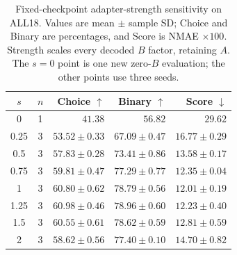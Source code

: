 \begin{table}[t]
\centering
\footnotesize
\setlength{\tabcolsep}{3pt}
\caption{Fixed-checkpoint adapter-strength sensitivity on ALL18. Values are mean $\pm$ sample SD; Choice and Binary are percentages, and Score is NMAE $\times100$. Strength scales every decoded $B$ factor, retaining $A$. The $s=0$ point is one new zero-$B$ evaluation; the other points use three seeds.}
\label{tab:adapter-strength-all18}
\begin{tabular}{ccrrr}
\toprule
$s$ & $n$ & Choice $\uparrow$ & Binary $\uparrow$ & Score $\downarrow$ \\
\midrule
0 & 1 & $41.38$ & $56.82$ & $29.62$ \\
0.25 & 3 & $53.52 \pm 0.33$ & $67.09 \pm 0.47$ & $16.77 \pm 0.29$ \\
0.5 & 3 & $57.83 \pm 0.28$ & $73.41 \pm 0.86$ & $13.58 \pm 0.17$ \\
0.75 & 3 & $59.81 \pm 0.47$ & $77.29 \pm 0.77$ & $12.35 \pm 0.04$ \\
1 & 3 & $60.80 \pm 0.62$ & $78.79 \pm 0.56$ & $12.01 \pm 0.19$ \\
1.25 & 3 & $60.98 \pm 0.46$ & $78.96 \pm 0.60$ & $12.23 \pm 0.40$ \\
1.5 & 3 & $60.55 \pm 0.61$ & $78.62 \pm 0.59$ & $12.81 \pm 0.59$ \\
2 & 3 & $58.62 \pm 0.56$ & $77.40 \pm 0.10$ & $14.70 \pm 0.82$ \\
\bottomrule
\end{tabular}
\end{table}
